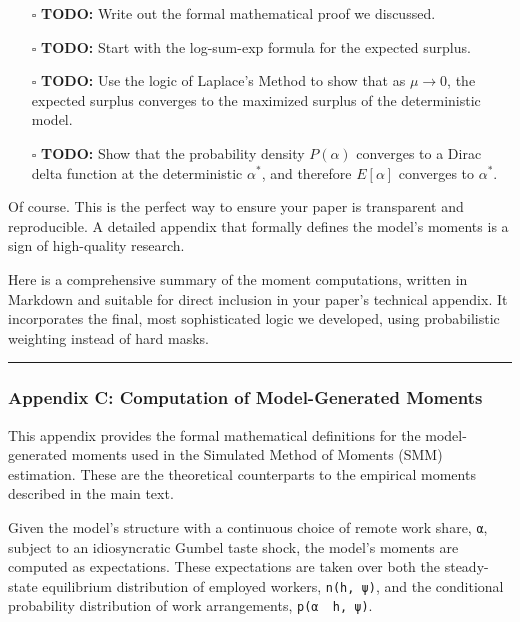 \documentclass[
  11pt,
  letterpaper,
  DIV=11,
  numbers=noendperiod]{scrartcl}
\providecommand{\tightlist}{%
  \setlength{\itemsep}{0pt}\setlength{\parskip}{0pt}}\usepackage{longtable,booktabs,array}
\begin{document}
\begin{itemize}
  \begin{itemize}
  \tightlist
  \item[$\square$]
    \textbf{TODO:} Write out the formal mathematical proof we discussed.
  \item[$\square$]
    \textbf{TODO:} Start with the log-sum-exp formula for the expected
    surplus.
  \item[$\square$]
    \textbf{TODO:} Use the logic of Laplace's Method to show that as
    \(\mu \to 0\), the expected surplus converges to the maximized
    surplus of the deterministic model.
  \item[$\square$]
    \textbf{TODO:} Show that the probability density \(P(\alpha)\)
    converges to a Dirac delta function at the deterministic
    \(\alpha^*\), and therefore \(E[\alpha]\) converges to \(\alpha^*\).
  \end{itemize}
\end{itemize}

Of course. This is the perfect way to ensure your paper is transparent
and reproducible. A detailed appendix that formally defines the model's
moments is a sign of high-quality research.

Here is a comprehensive summary of the moment computations, written in
Markdown and suitable for direct inclusion in your paper's technical
appendix. It incorporates the final, most sophisticated logic we
developed, using probabilistic weighting instead of hard masks.

\begin{center}\rule{0.5\linewidth}{0.5pt}\end{center}

\subsubsection{\texorpdfstring{\textbf{Appendix C: Computation of
Model-Generated
Moments}}{Appendix C: Computation of Model-Generated Moments}}\label{appendix-c-computation-of-model-generated-moments}

This appendix provides the formal mathematical definitions for the
model-generated moments used in the Simulated Method of Moments (SMM)
estimation. These are the theoretical counterparts to the empirical
moments described in the main text.

Given the model's structure with a continuous choice of remote work
share, \texttt{α}, subject to an idiosyncratic Gumbel taste shock, the
model's moments are computed as expectations. These expectations are
taken over both the steady-state equilibrium distribution of employed
workers, \texttt{n(h,\ ψ)}, and the conditional probability distribution
of work arrangements, \texttt{p(α\ \textbar{}\ h,\ ψ)}.
\end{document}
